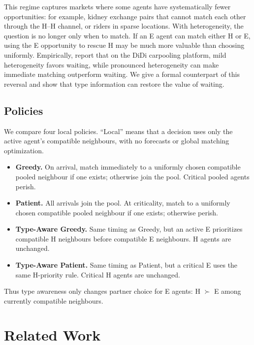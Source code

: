 \documentclass{article}
\theoremstyle{plain}
\theoremstyle{definition}
\begin{document}
This regime captures markets where some agents have systematically fewer opportunities: for example, kidney exchange pairs that cannot match each other through the H--H channel, or riders in sparse locations. With heterogeneity, the question is no longer only when to match. If an E agent can match either H or E, using the E opportunity to rescue H may be much more valuable than choosing uniformly. Empirically, \cite{Liu2019TheEO} report that on the DiDi carpooling platform, mild heterogeneity favors waiting, while pronounced heterogeneity can make immediate matching outperform waiting. We give a formal counterpart of this reversal and show that type information can restore the value of waiting.

\subsection{Policies}\label{ssec:policies}

We compare four local policies. ``Local'' means that a decision uses only the active agent's compatible neighbours, with no forecasts or global matching optimization.
\begin{itemize}
\item \textbf{Greedy.} On arrival, match immediately to a uniformly chosen compatible pooled neighbour if one exists; otherwise join the pool. Critical pooled agents perish.
\item \textbf{Patient.} All arrivals join the pool. At criticality, match to a uniformly chosen compatible pooled neighbour if one exists; otherwise perish.
\item \textbf{Type-Aware Greedy.} Same timing as Greedy, but an active E prioritizes compatible H neighbours before compatible E neighbours. H agents are unchanged.
\item \textbf{Type-Aware Patient.} Same timing as Patient, but a critical E uses the same H-priority rule. Critical H agents are unchanged.
\end{itemize}
Thus type awareness only changes partner choice for E agents: H $\succ$ E among currently compatible neighbours.

\section{Related Work}\label{sec:related}
\end{document}
